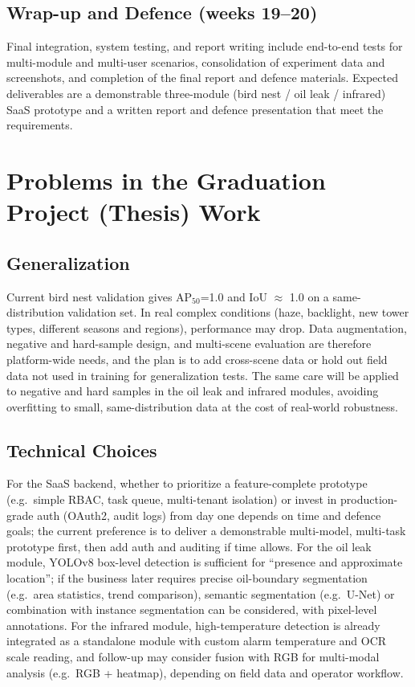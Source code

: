 \documentclass[12pt,a4paper]{article}
\begin{document}
\subsection{Wrap-up and Defence (weeks 19--20)}

Final integration, system testing, and report writing include end-to-end tests for multi-module and multi-user scenarios, consolidation of experiment data and screenshots, and completion of the final report and defence materials. Expected deliverables are a demonstrable three-module (bird nest / oil leak / infrared) SaaS prototype and a written report and defence presentation that meet the requirements.

\section{Problems in the Graduation Project (Thesis) Work}

\subsection{Generalization}

Current bird nest validation gives AP$_{50}$=1.0 and IoU $\approx$ 1.0 on a same-distribution validation set. In real complex conditions (haze, backlight, new tower types, different seasons and regions), performance may drop. Data augmentation, negative and hard-sample design, and multi-scene evaluation are therefore platform-wide needs, and the plan is to add cross-scene data or hold out field data not used in training for generalization tests. The same care will be applied to negative and hard samples in the oil leak and infrared modules, avoiding overfitting to small, same-distribution data at the cost of real-world robustness.

\subsection{Technical Choices}

For the SaaS backend, whether to prioritize a feature-complete prototype (e.g.\ simple RBAC, task queue, multi-tenant isolation) or invest in production-grade auth (OAuth2, audit logs) from day one depends on time and defence goals; the current preference is to deliver a demonstrable multi-model, multi-task prototype first, then add auth and auditing if time allows. For the oil leak module, YOLOv8 box-level detection is sufficient for ``presence and approximate location''; if the business later requires precise oil-boundary segmentation (e.g.\ area statistics, trend comparison), semantic segmentation (e.g.\ U-Net) or combination with instance segmentation can be considered, with pixel-level annotations. For the infrared module, high-temperature detection is already integrated as a standalone module with custom alarm temperature and OCR scale reading, and follow-up may consider fusion with RGB for multi-modal analysis (e.g.\ RGB + heatmap), depending on field data and operator workflow.
\end{document}
